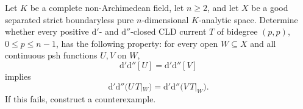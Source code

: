 \begin{problem}
\label{prob:frontier-cross-fan-upstairs}
Let $K$ be a complete non-Archimedean field, let $n\geq2$, and let $X$
be a good separated strict boundaryless pure $n$-dimensional
$K$-analytic space.  Determine whether every positive
$\mathrm d'$- and $\mathrm d''$-closed CLD current $T$ of bidegree
$(p,p)$, $0\leq p\leq n-1$, has the following property: for every open
$W\subseteq X$ and all continuous psh functions $U,V$ on $W$,
\[
                  \mathrm d'\mathrm d''[U]
                  =\mathrm d'\mathrm d''[V]
\]
implies
\[
 \mathrm d'\mathrm d''\bigl(U\,T|_W\bigr)
 =\mathrm d'\mathrm d''\bigl(V\,T|_W\bigr).
\]
If this fails, construct a counterexample.
\end{problem}
